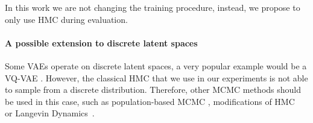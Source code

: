 In this work we are not changing the training procedure, instead, we propose to only use HMC during evaluation. 


\paragraph{A possible extension to discrete latent spaces}
Some VAEs operate on discrete latent spaces, a very popular example would be a VQ-VAE \cite{van2017neural}. However, the classical HMC that we use in our experiments is not able to sample from a discrete distribution. Therefore, other MCMC methods should be used in this case, such as population-based MCMC \cite{auzina2021approximate}, modifications of HMC~\cite{nishimura2020discontinuous} or Langevin Dynamics~\cite{zhang2022langevin}.







